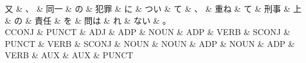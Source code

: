 \documentclass[tikz,border=5pt]{standalone}
\begin{document}
\normalsize
\begin{dependency}[edge unit distance=12.0pt]
    \begin{deptext}[column sep=1em]
        又 \& 、 \& 同一 \& の \& 犯罪 \& に \& つい \& て \& 、 \& 重ね \& て \& 刑事 \& 上 \& の \& 責任 \& を \& 問は \& れ \& ない \& 。\\
        CCONJ \& PUNCT \& ADJ \& ADP \& NOUN \& ADP \& VERB \& SCONJ \& PUNCT \& VERB \& SCONJ \& NOUN \& NOUN \& ADP \& NOUN \& ADP \& VERB \& AUX \& AUX \& PUNCT\\
    \end{deptext}
\end{dependency}
\end{document}

